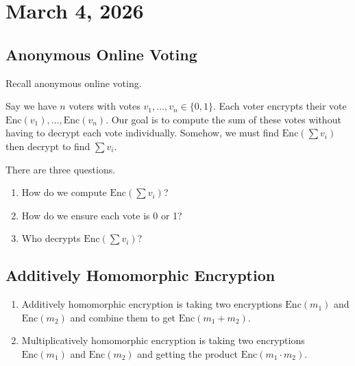 \section{March 4, 2026}
\label{20260304}

\subsection{Anonymous Online Voting}

Recall anonymous online voting.

Say we have $n$ voters with votes $v_1, \dots, v_n \in \{ 0, 1\}$. Each voter encrypts their vote $\text{Enc}(v_1), \dots, \text{Enc}(v_n)$. Our goal is to compute the sum of these votes without having to decrypt each vote individually. Somehow, we must find $\text{Enc}(\sum v_i)$ then decrypt to find $\sum v_i$.

There are three questions.
\begin{enumerate}
    \item How do we compute $\text{Enc}(\sum v_i)$?
    \item How do we ensure each vote is 0 or 1?
    \item Who decrypts $\text{Enc}(\sum v_i)$?
\end{enumerate}

\subsection{Additively Homomorphic Encryption}

\begin{enumerate}
    \item Additively homomorphic encryption is taking two encryptions $\text{Enc}(m_1)$ and $\text{Enc}(m_2)$ and combine them to get $\text{Enc}(m_1 + m_2)$.
    \item Multiplicatively homomorphic encryption is taking two encryptions $\text{Enc}(m_1)$ and $\text{Enc}(m_2)$ and getting the product $\text{Enc}(m_1 \cdot m_2)$.
\end{enumerate}

